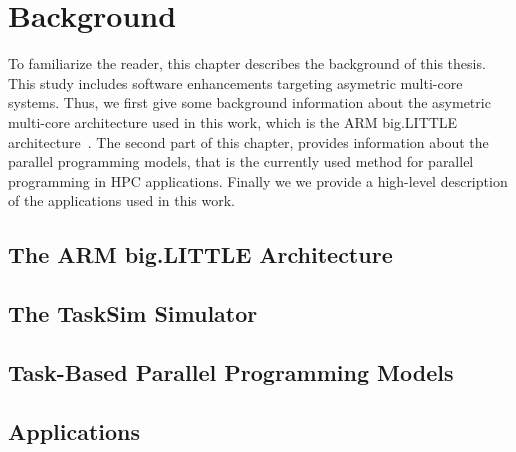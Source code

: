 \chapter{Background}
\label{chapter.background}
To familiarize the reader, this chapter describes the background of this thesis. 
This study includes software enhancements targeting asymetric multi-core systems.
Thus, we first give some background information about the asymetric multi-core architecture used in this work, which is the ARM big.LITTLE architecture~\cite{Greenhalgh2011}.
The second part of this chapter, provides information about the parallel programming models, that is the currently used method for parallel programming in HPC applications.
Finally we we provide a high-level description of the applications used in this work.

\section{The ARM big.LITTLE Architecture}
\label{sec.background.arm}


\section{The TaskSim Simulator}
\label{sec.background.simulation}


\section{Task-Based Parallel Programming Models}
\label{sec.background.taskbased}


\section{Applications}
\label{sec.background.applications}

